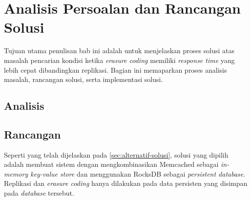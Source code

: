 \chapter{Analisis Persoalan dan Rancangan Solusi}
\label{chapter:analisis-persoalan-dan-rancangan-solusi}

Tujuan utama penulisan bab ini adalah untuk menjelaskan proses solusi atas masalah pencarian kondisi ketika \textit{erasure coding} memiliki \textit{response time} yang lebih cepat dibandingkan replikasi. Bagian ini memaparkan proses analisis masalah, rancangan solusi, serta implementasi solusi.


\section{Analisis}







\section{Rancangan}

Seperti yang telah dijelaskan pada \ref{sec:alternatif-solusi}, solusi yang dipilih adalah membuat sistem dengan mengkombinasikan Memcached sebagai \textit{in-memory key-value store} dan menggunakan RocksDB sebagai \textit{persistent database}. Replikasi dan \textit{erasure coding} hanya dilakukan pada data persisten yang disimpan pada \textit{database} tersebut.








